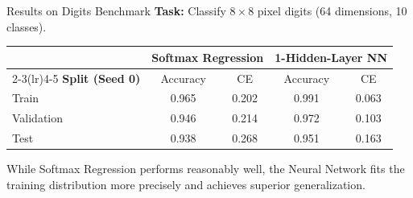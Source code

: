 \documentclass[11pt,aspectratio=169]{beamer}
\begin{document}
\begin{frame}{Results on Digits Benchmark}
    \textbf{Task:} Classify $8 \times 8$ pixel digits (64 dimensions, 10 classes).
    
    \vspace{1em}
    \begin{table}
        \centering
        \begin{tabular}{lcccc}
            \toprule
            & \multicolumn{2}{c}{\textbf{Softmax Regression}} &
              \multicolumn{2}{c}{\textbf{1-Hidden-Layer NN}} \\
            \cmidrule(lr){2-3}\cmidrule(lr){4-5}
            \textbf{Split (Seed 0)} & Accuracy & CE & Accuracy & CE \\
            \midrule
            Train      & 0.965 & 0.202 & 0.991 & 0.063 \\
            Validation & 0.946 & 0.214 & 0.972 & 0.103 \\
            Test       & 0.938 & 0.268 & 0.951 & 0.163 \\
            \bottomrule
        \end{tabular}
    \end{table}
    
    \vspace{0.5em}
    While Softmax Regression performs reasonably well, the Neural Network fits the training distribution more precisely and achieves superior generalization.
\end{frame}
\end{document}
